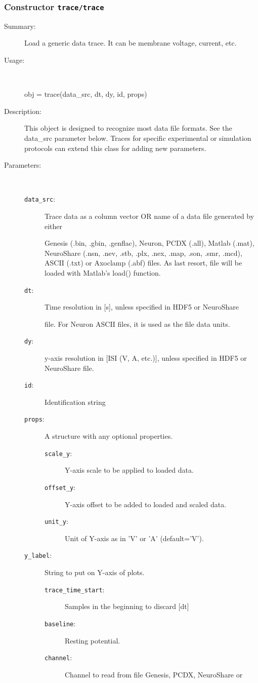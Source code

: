 \subsubsection[Constructor \texttt{trace}]{Constructor \texttt{trace/trace}}%
%
\label{ref_trace__trace}%
\hypertarget{ref_trace__trace}{}%
\begin{description}
\item[Summary:]Load a generic data trace. It can be membrane voltage, current, etc.
%
\item[Usage:]~%
\begin{lyxcode}%
obj = trace(data\_src, dt, dy, id, props)
%
\end{lyxcode}%
%
\item[Description:]%
This object is designed to recognize most data file formats. See the
 data\_src parameter below. Traces for specific experimental or simulation
 protocols can extend this class for adding new parameters.
\item[Parameters:]~
\begin{description}%
\item[\texttt{data\_src}:]
 Trace data as a column vector OR name of a data file generated by either 

Genesis (.bin, .gbin, .genflac), Neuron, PCDX (.all), Matlab (.mat),
NeuroShare (.nsn, .nev, .stb, .plx, .nex, .map, .son, .smr,
.mcd), ASCII (.txt) or Axoclamp (.abf) files. As last
resort, file will be loaded with Matlab's load() function.
\item[\texttt{dt}:]
 Time resolution in [s], unless specified in HDF5 or NeuroShare

file. For Neuron ASCII files, it is used as the file data units.
\item[\texttt{dy}:]
 y-axis resolution in [ISI (V, A, etc.)], unless specified in HDF5 or NeuroShare file.
\item[\texttt{id}:]
 Identification string
\item[\texttt{props}:]
 A structure with any optional properties.
\begin{description}%
\item[\texttt{scale\_y}:]
 Y-axis scale to be applied to loaded data.
\item[\texttt{offset\_y}:]
 Y-axis offset to be added to loaded and scaled data.
\item[\texttt{unit\_y}:]
 Unit of Y-axis as in 'V' or 'A' (default='V').
\end{description}%
\item[\texttt{y\_label}:]
 String to put on Y-axis of plots.
\begin{description}%
\item[\texttt{trace\_time\_start}:]
 Samples in the beginning to discard [dt]
\item[\texttt{baseline}:]
 Resting potential.
\item[\texttt{channel}:]
 Channel to read from file Genesis, PCDX, NeuroShare or


\end{description}
\end{description}
\end{description}
